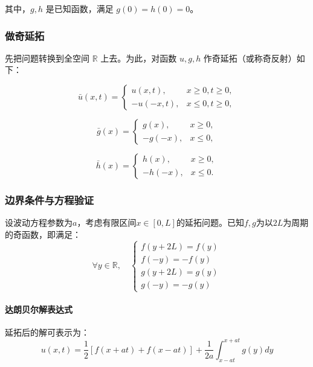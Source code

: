 \documentclass[a4paper, 12pt, oneside]{article} %
\numberwithin{subsection}{section}
\numberwithin{subsubsection}{subsection}
\theoremstyle{plain}
\theoremstyle{definition}
\theoremstyle{remark}
\begin{document}
		其中，\(g, h\) 是已知函数，满足 \(g(0) = h(0) = 0\)。
		
		\subsubsection{做奇延拓}
		先把问题转换到全空间 \(\mathbb{R}\) 上去。为此，对函数 \(u, g, h\) 作奇延拓（或称奇反射）如下：
		
		\begin{equation}
			\bar{u}(x, t) = \begin{cases}
				u(x, t), & x \geq 0, t \geq 0, \\
				-u(-x, t), & x \leq 0, t \geq 0,
			\end{cases}
		\end{equation}
		
		\begin{equation}
			\bar{g}(x) = \begin{cases}
				g(x), & x \geq 0, \\
				-g(-x), & x \leq 0,
			\end{cases}
		\end{equation}
		
		\begin{equation}
			\bar{h}(x) = \begin{cases}
				h(x), & x \geq 0, \\
				-h(-x), & x \leq 0.
			\end{cases}
		\end{equation}
		
		\subsubsection{边界条件与方程验证}
		设波动方程参数为$a$，考虑有限区间$x \in [0, L]$的延拓问题。已知$f,g$为以$2L$为周期的奇函数，即满足：
		\begin{equation}
			\forall y \in \mathbb{R},\quad 
			\begin{cases}
				f(y + 2L) = f(y) \\
				f(-y) = -f(y) \\
				g(y + 2L) = g(y) \\
				g(-y) = -g(y)
			\end{cases}
		\end{equation}
		
		\paragraph{达朗贝尔解表达式}
		延拓后的解可表示为：
		\begin{equation}
			u(x,t) = \frac{1}{2}[f(x + at) + f(x - at)] + \frac{1}{2a}\int_{x-at}^{x+at} g(y) dy
		\end{equation}
		
\end{document}
